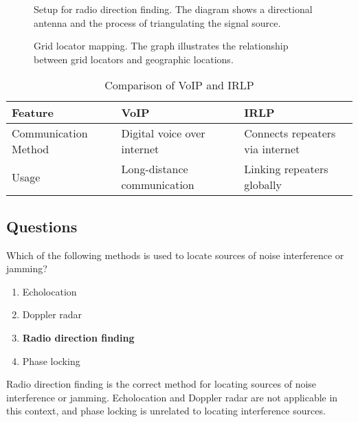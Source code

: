 \begin{figure}[h]
    \centering
    \caption{Setup for radio direction finding. The diagram shows a directional antenna and the process of triangulating the signal source.}
    \label{fig:direction_finding}
\end{figure}

\begin{figure}[h]
    \centering
    \caption{Grid locator mapping. The graph illustrates the relationship between grid locators and geographic locations.}
    \label{fig:grid_locator}
\end{figure}

\begin{table}[h]
    \centering
    \begin{tabular}{|l|l|l|}
        \hline
        \textbf{Feature} & \textbf{VoIP} & \textbf{IRLP} \\
        \hline
        Communication Method & Digital voice over internet & Connects repeaters via internet \\
        \hline
        Usage & Long-distance communication & Linking repeaters globally \\
        \hline
    \end{tabular}
    \caption{Comparison of VoIP and IRLP}
    \label{tab:voip_irlp}
\end{table}

\subsection*{Questions}
\begin{tcolorbox}[colback=gray!10!white,colframe=black!75!black,title={T8C01}]
    Which of the following methods is used to locate sources of noise interference or jamming?
    \begin{enumerate}[label=\Alph*,noitemsep]
        \item Echolocation
        \item Doppler radar
        \item \textbf{Radio direction finding}
        \item Phase locking
    \end{enumerate}
\end{tcolorbox}
Radio direction finding is the correct method for locating sources of noise interference or jamming. Echolocation and Doppler radar are not applicable in this context, and phase locking is unrelated to locating interference sources.

